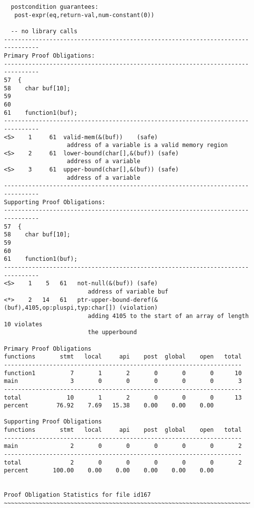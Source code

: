 \documentclass[11pt]{article}
\begin{document}
\begin{scriptsize}
\begin{verbatim}
  postcondition guarantees:
   post-expr(eq,return-val,num-constant(0))

  -- no library calls
--------------------------------------------------------------------------------
Primary Proof Obligations:
--------------------------------------------------------------------------------
57  {
58    char buf[10];
59
60
61    function1(buf);
--------------------------------------------------------------------------------
<S>    1     61  valid-mem(&(buf))    (safe)
                  address of a variable is a valid memory region
<S>    2     61  lower-bound(char[],&(buf)) (safe)
                  address of a variable
<S>    3     61  upper-bound(char[],&(buf)) (safe)
                  address of a variable
--------------------------------------------------------------------------------
Supporting Proof Obligations:
--------------------------------------------------------------------------------
57  {
58    char buf[10];
59
60
61    function1(buf);
--------------------------------------------------------------------------------
<S>    1    5   61   not-null(&(buf)) (safe)
                        address of variable buf
<*>    2   14   61   ptr-upper-bound-deref(&(buf),4105,op:pluspi,typ:char[]) (violation)
                        adding 4105 to the start of an array of length 10 violates 
                        the upperbound

Primary Proof Obligations
functions       stmt   local     api    post  global    open   total
--------------------------------------------------------------------
function1          7       1       2       0       0       0      10
main               3       0       0       0       0       0       3
--------------------------------------------------------------------
total             10       1       2       0       0       0      13
percent        76.92    7.69   15.38    0.00    0.00    0.00

Supporting Proof Obligations
functions       stmt   local     api    post  global    open   total
--------------------------------------------------------------------
main               2       0       0       0       0       0       2
--------------------------------------------------------------------
total              2       0       0       0       0       0       2
percent       100.00    0.00    0.00    0.00    0.00    0.00


Proof Obligation Statistics for file id167
~~~~~~~~~~~~~~~~~~~~~~~~~~~~~~~~~~~~~~~~~~~~~~~~~~~~~~~~~~~~~~~~~~~~~~~~~~~~~~~~


\end{verbatim}
\end{scriptsize}
\end{document}
